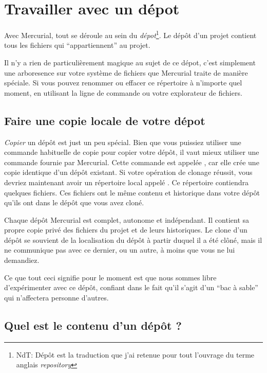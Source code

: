 \section{Travailler avec un dépot}

Avec Mercurial, tout se déroule au sein du \emph{dépot}\footnote{NdT: Dépôt est
la traduction que j'ai retenue pour tout l'ouvrage du terme anglais \textit{repository}}.
Le dépôt d'un projet contient tous les fichiers qui ``appartiennent'' au projet.

Il n'y a rien de particulièrement magique au sujet de ce dépot, c'est
simplement une arboresence sur votre système de fichiers que Mercurial
traite de manière spéciale. Si vous pouvez renommer ou effacer ce répertoire
à n'importe quel moment, en utilisant la ligne de commande ou votre
explorateur de fichiers.

\subsection{Faire une copie locale de votre dépot}

\emph{Copier} un dépôt est just un peu spécial. Bien que vous 
puissiez utiliser une commande habituelle de copie pour copier
votre dépôt, il vaut mieux utiliser une commande fournie par
Mercurial. Cette commande est appelée , car elle
crée une copie identique d'un dépôt existant.
Si votre opération de clonage réussit, vous devriez maintenant
avoir un répertoire local appelé . Ce répertoire
contiendra quelques fichiers.
Ces fichiers ont le même contenu et historique dans votre dépôt
qu'ils ont dans le dépôt que vous avez cloné.

Chaque dépôt Mercurial est complet, autonome et indépendant. Il
contient sa propre copie privé des fichiers du projet et de leurs
historiques. Le clone d'un dépôt se souvient de la localisation du
dépôt à partir duquel il a été clôné, mais il ne communique pas avec
ce dernier, ou un autre, à moins que vous ne lui demandiez.

Ce que tout ceci signifie pour le moment est que nous sommes libre
d'expérimenter avec ce dépôt, confiant dans le fait qu'il s'agit d'un
``bac à sable'' qui n'affectera personne d'autres.

\subsection{Quel est le contenu d'un dépôt ?}

